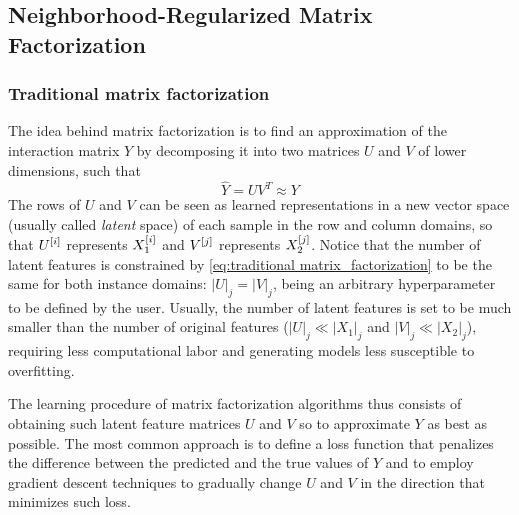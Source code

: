 


\subsection{Neighborhood-Regularized Matrix Factorization}
\label{sec:nrlmf}

\subsubsection{Traditional matrix factorization}
\label{sec:traditional matrix factorization}



The idea behind matrix factorization is to find an approximation of the interaction matrix $Y$ by decomposing it into two matrices $U$ and $V$ of lower dimensions, such that %
%
\begin{equation}
    \hat Y = U V^T \approx Y
    \label{eq:traditional matrix_factorization}
\end{equation}
%
The rows of $U$ and $V$ can be seen as learned representations in a new vector space (usually called \emph{latent} space) of each sample in the row and column domains, so that $U^{[i]}$ represents $X_1^{[i]}$ and $V^{[j]}$ represents $X_2^{[j]}$.
%
Notice that the number of latent features is constrained by \autoref{eq:traditional matrix_factorization} to be the same for both instance domains: $|U|_j=|V|_j$, being an arbitrary hyperparameter to be defined by the user. Usually, the number of latent features is set to be much smaller than the number of original features ($|U|_j \ll |X_1|_j$ and $|V|_j \ll |X_2|_j$), requiring less computational labor and generating models less susceptible to overfitting.

The learning procedure of matrix factorization algorithms thus consists of obtaining such latent feature matrices $U$ and $V$ so to approximate $Y$ as best as possible. The most common approach is to define a loss function that penalizes the difference between the predicted and the true values of $Y$ and to employ gradient descent techniques to gradually change $U$ and $V$ in the direction that minimizes such loss.
%


